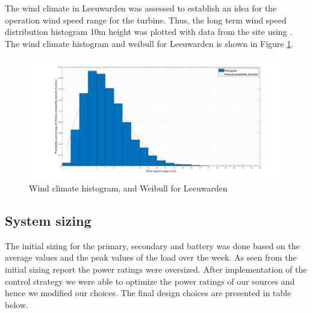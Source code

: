 \noindent The wind climate in Leeuwarden was assessed to establish an idea for the operation wind speed range for the turbine. Thus, the long term wind speed distribution histogram 10m height was plotted with data from the site using \citep{Power}. The wind climate histogram and weibull for Leeuwarden is shown in Figure \ref{fig:hist}. 


\begin{figure}[H]
    \centering
    \includegraphics[width=1.1 \linewidth]{Final_report/Images/Hist.png}
    \caption{Wind climate histogram, and Weibull for Leeuwarden}
    \label{fig:hist}
\end{figure}

\newpage

\subsection{System sizing}

The initial sizing for the primary, secondary and battery was done based on the average values and the peak values of the load over the week. As seen from the initial sizing report the power ratings were oversized. After implementation of the control strategy we were able to optimize the power ratings of our sources and hence we modified our choices. The final design choices are presented in table below.


